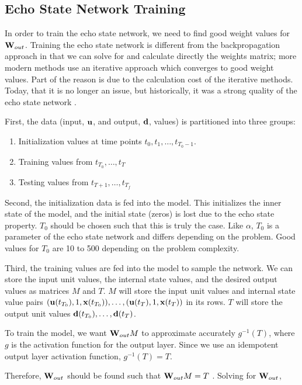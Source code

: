 \documentclass{article}
\begin{document}
\subsection{Echo State Network Training}
\label{sec:etrain}

In order to train the echo state network, we need to find good 
weight values for $\mathbf{W}_{out}$. Training the echo state network is different
from the backpropagation approach in that we can solve for
and calculate directly the weights matrix; more modern methods use
an iterative approach which converges to good weight values. Part of the
reason is due to the calculation cost of the iterative methods. Today, that
it is no longer an issue, but historically, it was a strong quality of
the echo state network \cite{jaeger2007echo}.

First, the data (input, $\mathbf{u}$, and output, $\mathbf{d}$, values) is partitioned into three groups:
\begin{enumerate}
    \item Initialization values at time points
    $t_0, t_1, \dots, t_{T_0-1}$.
    \item Training values from
    $t_{T_0}, \dots, t_T$
    \item Testing values from
    $t_{T+1}, \dots, t_{T_f}$
\end{enumerate}

Second, the initialization data is fed into the model. This initializes the
inner state of the model, and the initial state (zeros) is lost due to the 
echo state property. $T_0$ should be chosen such that this is truly the 
case. Like $\alpha$, $T_0$ is a parameter of the echo state network and
differs depending on the problem. Good values for $T_0$ are 10 to 500 
depending on the problem complexity.

Third, the training values are fed into the model to sample the network.
We can store the input unit values, the internal state values, and the 
desired output values as matrices $M$ and $T$. $M$ will store the input 
unit values and internal state value pairs
$(\mathbf{u}(t_{T_0}), 1, \mathbf{x}(t_{T_0})), \dots, (\mathbf{u}(t_T), 1, \mathbf{x}(t_T))$
in its rows. $T$ will store the output unit values
$\mathbf{d}(t_{T_0}), \dots, \mathbf{d}(t_T)$.

To train the model, we want $\mathbf{W}_{out} M$ to approximate accurately
$g^{-1}(T)$, where $g$ is the activation function for the output layer.
Since we use an idempotent output layer activation function,
$g^{-1}(T) = T$.

Therefore, $\mathbf{W}_{out}$ should be found such that $\mathbf{W}_{out} M = T$ 
\cite{jaeger2002tutorial}.
Solving for $\mathbf{W}_{out}$,
\end{document}
